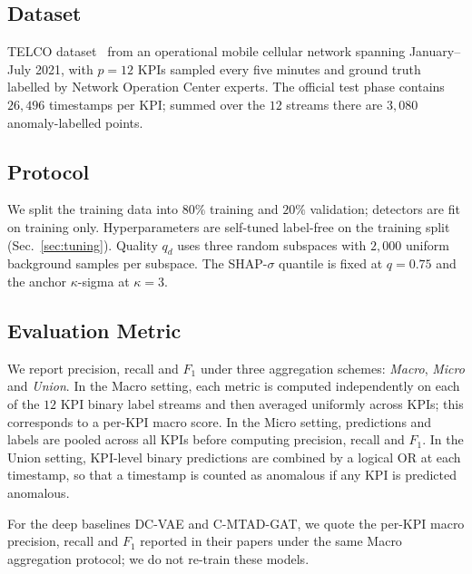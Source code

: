 \documentclass[conference]{IEEEtran}
\begin{document}
\subsection{Dataset}
TELCO dataset~\cite{gonzalez2023one} from an
operational mobile cellular network spanning January--July 2021, with
$p{=}12$ KPIs sampled every five minutes and ground truth labelled
by Network Operation Center experts. The official test phase contains
$26{,}496$ timestamps per KPI; summed over the $12$ streams there are
$3{,}080$ anomaly-labelled points.

\subsection{Protocol}
We split the training data into $80\%$ training and $20\%$ validation;
detectors are fit on training only. Hyperparameters are self-tuned
label-free on the training split (Sec.~\ref{sec:tuning}).
Quality $q_d$ uses three random subspaces with $2{,}000$ uniform
background samples per subspace. The SHAP-$\sigma$ quantile is fixed
at $q{=}0.75$ and the anchor $\kappa$-sigma at $\kappa{=}3$.


\subsection{Evaluation Metric}
We report precision, recall and $F_1$ under three aggregation schemes:
\emph{Macro}, \emph{Micro} and \emph{Union}. In the Macro setting, each
metric is computed independently on each of the $12$ KPI binary label
streams and then averaged uniformly across KPIs; this corresponds to a
per-KPI macro score. In the Micro setting, predictions and labels are
pooled across all KPIs before computing precision, recall and $F_1$.
In the Union setting, KPI-level binary predictions are combined by a
logical OR at each timestamp, so that a timestamp is counted as anomalous
if any KPI is predicted anomalous.

For the deep baselines DC-VAE and C-MTAD-GAT, we quote the per-KPI macro
precision, recall and $F_1$ reported in their papers under the same
Macro aggregation protocol; we do not re-train these models.
\end{document}
